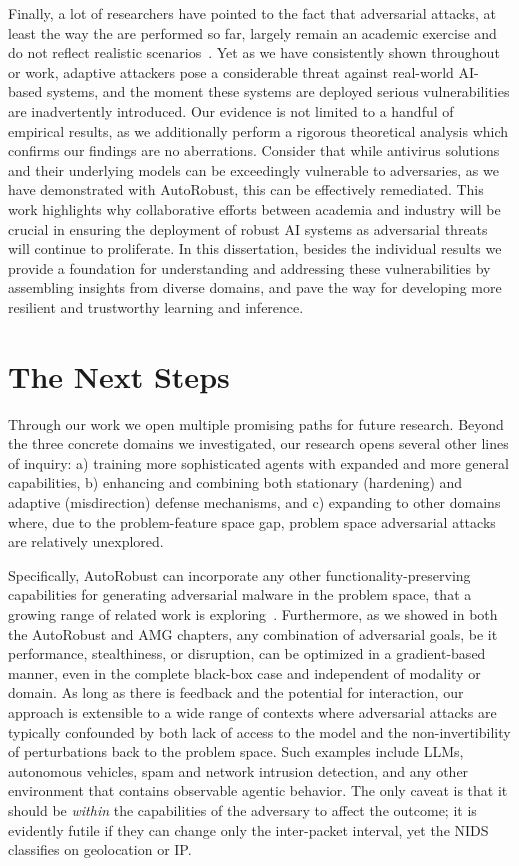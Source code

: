 Finally, a lot of researchers have pointed to the fact that adversarial attacks, at least the way the are performed so far, largely remain an academic exercise and do not reflect realistic scenarios~\cite{apruzzese2023real}.
Yet as we have consistently shown throughout or work, adaptive attackers pose a considerable threat against real-world AI-based systems, and the moment these systems are deployed serious vulnerabilities are inadvertently introduced.
Our evidence is not limited to a handful of empirical results, as we additionally perform a rigorous theoretical analysis which confirms our findings are no aberrations.
Consider that while antivirus solutions and their underlying models can be exceedingly vulnerable to adversaries, as we have demonstrated with AutoRobust, this can be effectively remediated.
This work highlights why collaborative efforts between academia and industry will be crucial in ensuring the deployment of robust \gls{AI} systems as adversarial threats will continue to proliferate.
In this dissertation, besides the individual results we provide a foundation for understanding and addressing these vulnerabilities by assembling insights from diverse domains, and pave the way for developing more resilient and trustworthy learning and inference.

\section{The Next Steps}

Through our work we open multiple promising paths for future research.
Beyond the three concrete domains we investigated, our research opens several other lines of inquiry: a) training more sophisticated agents with expanded and more general capabilities, b) enhancing and combining both stationary (hardening) and adaptive (misdirection) defense mechanisms, and c) expanding to other domains where, due to the problem-feature space gap, problem space adversarial attacks are relatively unexplored.

Specifically, AutoRobust can incorporate any other functionality-preserving capabilities for generating adversarial malware in the problem space, that a growing range of related work is exploring~\cite{demetrio2021functionality, demetrio2021adversarial, labaca2021realizable, labaca2021aimed}.
Furthermore, as we showed in both the AutoRobust and AMG chapters, any combination of adversarial goals, be it performance, stealthiness, or disruption, can be optimized in a gradient-based manner, even in the complete black-box case and independent of modality or domain.
As long as there is feedback and the potential for interaction, our approach is extensible to a wide range of contexts where adversarial attacks are typically confounded by both lack of access to the model and the non-invertibility of perturbations back to the problem space.
Such examples include LLMs, autonomous vehicles, spam and network intrusion detection, and any other environment that contains observable agentic behavior.
The only caveat is that it should be \textit{within} the capabilities of the adversary to affect the outcome; it is evidently futile if they can change only the inter-packet interval, yet the \gls{NIDS} classifies on geolocation or IP.

